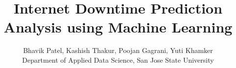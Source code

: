 %
%






\documentclass[journal]{IEEEtran}

\usepackage{xcolor,soul,framed} %

\usepackage[pdftex]{graphicx}
\graphicspath{{../pdf/}{../jpeg/}}

\usepackage[cmex10]{amsmath}
\usepackage{array}
\usepackage{mdwmath}
\usepackage{mdwtab}
\usepackage{eqparbox}
\usepackage{url}





    \title{Internet Downtime Prediction Analysis using Machine Learning}
  \author{Bhavik Patel, Kashish Thakur,  Poojan Gagrani, Yuti Khamker

Department of Applied Data Science, San Jose State University}
  
   
      
      
   

 






\maketitle



